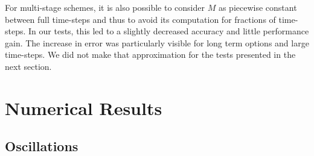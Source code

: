 \documentclass[]{rAMF2e}
\begin{document}
For multi-stage schemes, it is also possible to consider $M$ as piecewise constant between full time-steps and thus to avoid its computation for fractions of time-steps. In our tests, this led to a slightly decreased accuracy and little performance gain. The increase in error was particularly visible for long term options and large time-steps. We did not make that approximation for the tests presented in the next section.

\section{Numerical Results}
\subsection{Oscillations}
\begin{figure}[htb]
  \begin{center}  

\end{center}
\end{figure}
\end{document}
